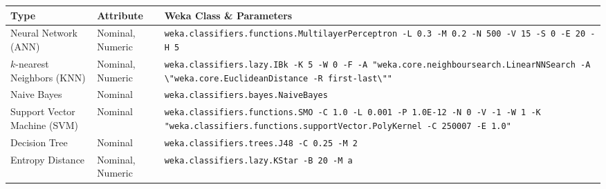 \documentclass[../thesis/thesis.tex]{subfiles}
\begin{document}
\begin{table}[h]
\centering
\begin{tabular}{|p{40mm}|p{20mm}|p{70mm}|}
\hline
\textbf{Type} & \textbf{Attribute} & \textbf{Weka Class} \& \textbf{Parameters} \\ \hline

{Neural Network \newline (ANN)} & {Nominal, \newline Numeric} & \texttt{weka.classifiers.functions\newline.MultilayerPerceptron \newline -L 0.3 -M 0.2 -N 500 -V 15 \newline -S 0 -E 20 -H 5} \\ \hline

{$k$-nearest Neighbors \newline (KNN)} & Nominal, \newline Numeric & \texttt{weka.classifiers.lazy.IBk \newline -K 5 -W 0 -F \newline -A "weka.core.neighboursearch\newline.LinearNNSearch -A \textbackslash"weka.core\newline.EuclideanDistance \newline -R first-last\textbackslash""} \\ \hline

Naive Bayes & Nominal & \texttt{weka.classifiers.bayes.NaiveBayes} \\ \hline

{Support Vector \newline Machine (SVM)} & Nominal & \texttt{weka.classifiers.functions.SMO \newline -C 1.0 -L 0.001 -P 1.0E-12 \newline -N 0 -V -1 -W 1 \newline -K "weka.classifiers.functions\newline.supportVector.PolyKernel \newline-C 250007 -E 1.0"} \\ \hline

Decision Tree & Nominal & \texttt{weka.classifiers.trees.J48 \newline -C 0.25 -M 2} \\ \hline

Entropy Distance & Nominal, \newline Numeric & \texttt{weka.classifiers.lazy.KStar \newline -B 20 -M a} \\ \hline %


\end{tabular}
\end{table}
\end{document}
